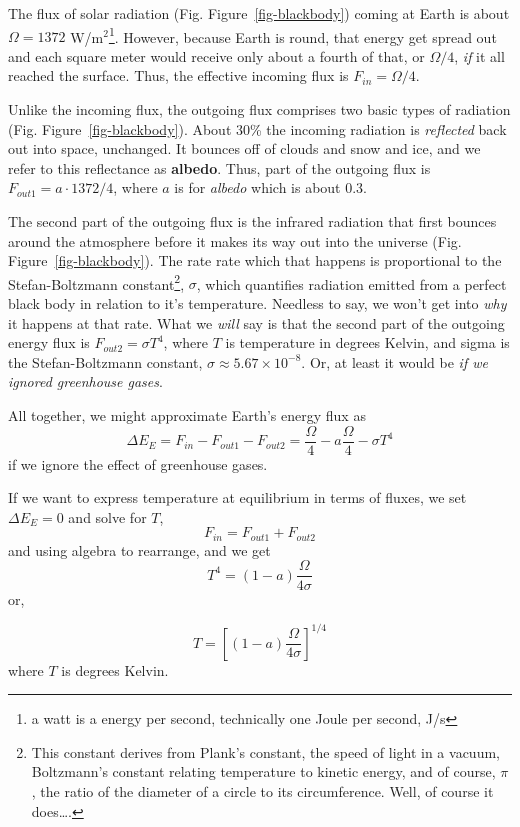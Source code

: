 \documentclass[
  letterpaper,
  DIV=11,
  numbers=noendperiod]{scrreprt}
\begin{document}
The flux of solar radiation (Fig. Figure~\ref{fig-blackbody}) coming at
Earth is about \(\Omega = 1372\) W/m\(^2\)\footnote{a watt is a energy
  per second, technically one Joule per second, J/s}. However, because
Earth is round, that energy get spread out and each square meter would
receive only about a fourth of that, or \(\Omega/4\), \emph{if} it all
reached the surface. Thus, the effective incoming flux is
\(F_{in} = \Omega/4\).

Unlike the incoming flux, the outgoing flux comprises two basic types of
radiation (Fig. Figure~\ref{fig-blackbody}). About 30\% the incoming
radiation is \emph{reflected} back out into space, unchanged. It bounces
off of clouds and snow and ice, and we refer to this reflectance as
\textbf{albedo}. Thus, part of the outgoing flux is
\(F_{out1} = a\cdot1372/4\), where \(a\) is for \emph{albedo} which is
about 0.3.

The second part of the outgoing flux is the infrared radiation that
first bounces around the atmosphere before it makes its way out into the
universe (Fig. Figure~\ref{fig-blackbody}). The rate rate which that
happens is proportional to the Stefan-Boltzmann constant\footnote{This
  constant derives from Plank's constant, the speed of light in a
  vacuum, Boltzmann's constant relating temperature to kinetic energy,
  and of course, \(\pi\), the ratio of the diameter of a circle to its
  circumference. Well, of course it does\ldots.}, \(\sigma\), which
quantifies radiation emitted from a perfect black body in relation to
it's temperature. Needless to say, we won't get into \emph{why} it
happens at that rate. What we \emph{will} say is that the second part of
the outgoing energy flux is \(F_{out2} = \sigma T^4\), where \(T\) is
temperature in degrees Kelvin, and sigma is the Stefan-Boltzmann
constant, \(\sigma \approx 5.67 \times 10^{-8}\). Or, at least it would
be \emph{if we ignored greenhouse gases}.

All together, we might approximate Earth's energy flux as
\[\Delta E_E = F_{in} - F_{out1} - F_{out2} = \frac{\Omega}{4} - a\frac{\Omega}{4} - \sigma T^4\]
if we ignore the effect of greenhouse gases.

If we want to express temperature at equilibrium in terms of fluxes, we
set \(\Delta E_E = 0\) and solve for \(T\),
\[F_{in} = F_{out1} + F_{out2}\] and using algebra to rearrange, and we
get \[T^4 = \left(1-a\right)\frac{\Omega}{4\sigma}\] or,

\[T = \left[ \left(1-a\right)\frac{\Omega}{4\sigma} \right] ^{1/4}\]
where \(T\) is degrees Kelvin.
\end{document}
